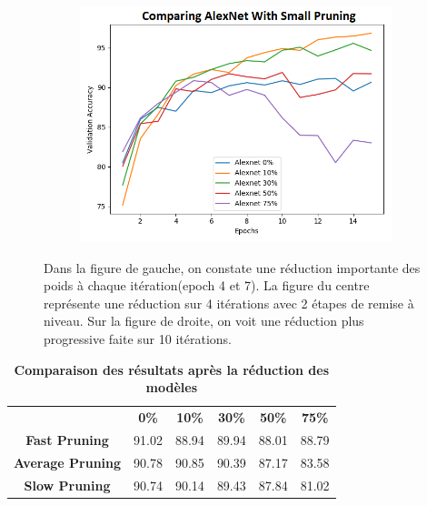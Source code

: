 \documentclass[12pt]{article}
\begin{document}
\begin{figure}[H]
\begin{subfigure}[b]{0.33\textwidth}
		\label{fig:pruneratioslow}
	\end{subfigure}
	\begin{subfigure}[b]{0.33\textwidth}
		\centering
		\includegraphics[width=\textwidth]{prune_ratio_slow}
		\label{fig:pruneratioslow}
	\end{subfigure}
	\caption{Dans la figure de gauche, on constate une réduction importante des poids à chaque itération(epoch 4 et 7). La figure du centre représente une réduction sur 4 itérations avec 2 étapes de remise à niveau. Sur la figure de droite, on voit une réduction plus progressive faite sur 10 itérations.}
\end{figure}

\begin{table}[H]
	\centering
	\caption {\textbf{Comparaison des résultats après la réduction des modèles}}
	\begin{tabular}{clllll}
		\textbf{}                & \multicolumn{1}{c}{\textbf{0\%}} & \multicolumn{1}{c}{\textbf{10\%}} & \multicolumn{1}{c}{\textbf{30\%}} & \multicolumn{1}{c}{\textbf{50\%}} & \multicolumn{1}{c}{\textbf{75\%}} \\
		\textbf{Fast Pruning}    & 91.02                            & 88.94                             & 89.94                             & 88.01                             & 88.79                             \\
		\textbf{Average Pruning} & 90.78                            & 90.85                             & 90.39                             & 87.17                             & 83.58                             \\
		\textbf{Slow Pruning}    & 90.74                            & 90.14                             & 89.43                             & 87.84                             & 81.02                            
	\end{tabular}
\end{table}
\end{document}
